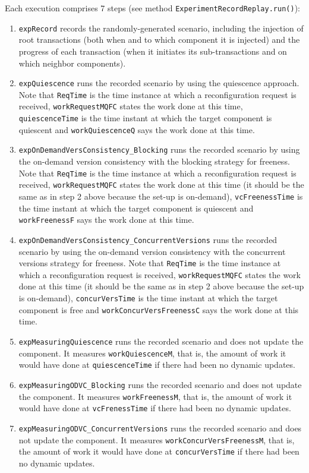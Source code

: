 \documentclass[a4paper,10pt]{article}
\begin{document}
Each execution comprises 7 steps (see method \texttt{ExperimentRecordReplay.run()}): 

\begin{enumerate}
\item \texttt{expRecord} records the randomly-generated scenario, including the injection of root transactions (both when and to
which component it is injected) and the progress of each transaction (when it initiates its sub-transactions and on which
neighbor components).
\item \texttt{expQuiescence} runs the recorded scenario by using the quiescence approach. Note that \texttt{ReqTime} is the time
instance at which a reconfiguration request is received, \texttt{workRequestMQFC} states the work done at this time,
\texttt{quiescenceTime} is the time instant at which the target component is quiescent and \texttt{workQuiescenceQ} says the
work done at this time.
\item \texttt{expOnDemandVersConsistency\_Blocking} runs the recorded scenario by using the on-demand version consistency with
the blocking strategy for freeness. Note that \texttt{ReqTime} is the time instance at which a reconfiguration request is
received, \texttt{workRequestMQFC} states the work done at this time (it should be the same as in step 2 above because the
set-up is on-demand), \texttt{vcFreenessTime} is the time instant at which the target component is quiescent and
\texttt{workFreenessF} says the work done at this time.
\item \texttt{expOnDemandVersConsistency\_ConcurrentVersions} runs the recorded scenario by using the on-demand version
consistency with the concurrent versions strategy for freeness. Note that \texttt{ReqTime} is the time instance at which a
reconfiguration request is received, \texttt{workRequestMQ\-FC} states the work done at this time (it should be the same as in
step 2 above because the set-up is on-demand), \texttt{concurVersTime} is the time instant at which the target component is free
and \texttt{workConcurVersFreenessC} says the work done at this time.
\item \texttt{expMeasuringQuiescence} runs the recorded scenario and does not update the component. It measures
\texttt{workQuiescenceM}, that is, the amount of work it would have done at \texttt{quiescence\-Time} if there had been no
dynamic updates.
\item \texttt{expMeasuringODVC\_Blocking} runs the recorded scenario and does not update the component. It measures
\texttt{workFreenessM}, that is, the amount of work it would have done at \texttt{vcFrenessTi\-me} if there had been
no dynamic updates.
\item \texttt{expMeasuringODVC\_ConcurrentVersions} runs the recorded scenario and does not update the component. It measures
\texttt{workConcurVersFreenessM}, that is, the amount of work it would have done at \texttt{concurVersTime} if there had
been no dynamic updates.
\end{enumerate}
\end{document}
